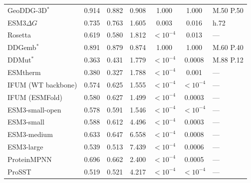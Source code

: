 {\begin{longtable}{lcccccl}
GeoDDG-3D$^*$ & 0.914 & 0.882 & 0.908 & 1.000 & 1.000 & M.50 P.50 \\
ESM3$\Delta G$ & 0.735 & 0.763 & 1.605 & 0.003 & 0.016 & h.72 \\
Rosetta & 0.619 & 0.580 & 1.812 & $<10^{-4}$ & 0.013 & --- \\
DDGemb$^*$ & 0.891 & 0.879 & 0.874 & 1.000 & 1.000 & M.60 P.40 \\
DDMut$^*$ & 0.363 & 0.431 & 1.779 & $<10^{-4}$ & 0.0008 & M.88 P.12 \\
ESMtherm & 0.380 & 0.327 & 1.788 & $<10^{-4}$ & 0.001 & --- \\
IFUM (WT backbone) & 0.574 & 0.625 & 1.555 & $<10^{-4}$ & $<10^{-4}$ & --- \\
IFUM (ESMFold) & 0.580 & 0.627 & 1.499 & $<10^{-4}$ & 0.0003 & --- \\
ESM3-small-open & 0.578 & 0.591 & 1.546 & $<10^{-4}$ & $<10^{-4}$ & --- \\
ESM3-small & 0.588 & 0.612 & 4.496 & $<10^{-4}$ & 0.0003 & --- \\
ESM3-medium & 0.633 & 0.647 & 6.558 & $<10^{-4}$ & 0.0008 & --- \\
ESM3-large & 0.539 & 0.513 & 7.439 & $<10^{-4}$ & 0.0006 & --- \\
ProteinMPNN & 0.696 & 0.662 & 2.400 & $<10^{-4}$ & 0.0005 & --- \\
ProSST & 0.519 & 0.521 & 4.217 & $<10^{-4}$ & $<10^{-4}$ & --- \\
\end{longtable}
}




